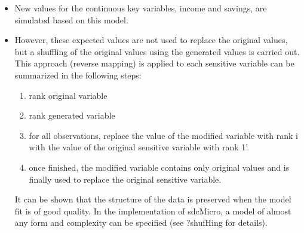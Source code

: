 \documentclass[]{article}
\begin{document}
\begin{itemize}
\item New values for the
continuous key variables, income and savings, are simulated based on this model.
\item However, these expected
values are not used to replace the original values, but a shuffling of the original
values using the generated values is carried out. This approach (reverse mapping)
is applied to each sensitive variable can be summarized in the following steps:
\begin{enumerate}
\item rank original variable
\item rank generated variable
\item for all observations, replace the value of the modiﬁed variable with rank i
with the value of the original sensitive variable with rank 1'.
\item once finished, the modiﬁed variable contains only original values and is ﬁnally
used to replace the original sensitive variable.
\end{enumerate}
It can be shown that the structure of the data is preserved when the model ﬁt
is of good quality. In the implementation of sdcMicro, a model of almost any form
and complexity can be speciﬁed (see ?shufHing for details).
\end{itemize}
\end{document}
